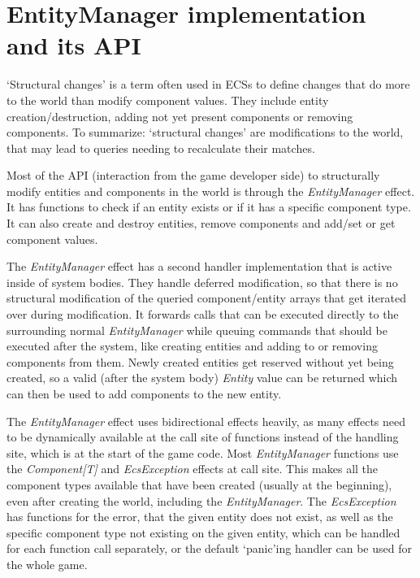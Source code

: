 \section{EntityManager implementation and its API}

`Structural changes' is a term often used in ECSs to define changes that do more to the world than modify component values. They include entity creation/destruction, adding not yet present components or removing components. To summarize: `structural changes' are modifications to the world, that may lead to queries needing to recalculate their matches.

Most of the API (interaction from the game developer side) to structurally modify entities and components in the world is through the \textit{EntityManager} effect. It has functions to check if an entity exists or if it has a specific component type. It can also create and destroy entities, remove components and add/set or get component values.

The \textit{EntityManager} effect has a second handler implementation that is active inside of system bodies. They handle deferred modification, so that there is no structural modification of the queried component/entity arrays that get iterated over during modification. It forwards calls that can be executed directly to the surrounding normal \textit{EntityManager} while queuing commands that should be executed after the system, like creating entities and adding to or removing components from them. Newly created entities get reserved without yet being created, so a valid (after the system body) \textit{Entity} value can be returned which can then be used to add components to the new entity.

The \textit{EntityManager} effect uses bidirectional effects heavily, as many effects need to be dynamically available at the call site of functions instead of the handling site, which is at the start of the game code. Most \textit{EntityManager} functions use the \textit{Component[T]} and \textit{EcsException} effects at call site. This makes all the component types available that have been created (usually at the beginning), even after creating the world, including the \textit{EntityManager}. The \textit{EcsException} has functions for the error, that the given entity does not exist, as well as the specific component type not existing on the given entity, which can be handled for each function call separately, or the default `panic'ing handler can be used for the whole game.

